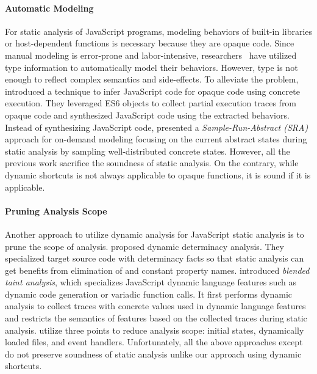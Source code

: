 \paragraph{Automatic Modeling}
For static analysis of JavaScript programs, modeling behaviors of built-in
libraries or host-dependent functions is necessary because they are opaque code.
Since manual modeling is error-prone and labor-intensive,
researchers~\cite{safewapi, safets} have utilized type information to
automatically model their behaviors.  However, type is not enough
to reflect complex semantics and side-effects.
To alleviate the problem, \citet{mimic} introduced a technique
to infer JavaScript code for opaque code using concrete execution.
They leveraged ES6  objects to collect partial execution traces
from opaque code and synthesized JavaScript code using the extracted behaviors.
Instead of synthesizing JavaScript code,
\citet{opaque-model} presented a \textit{Sample-Run-Abstract (SRA)} approach for
on-demand modeling focusing on the current abstract states during static analysis
by sampling well-distributed concrete states.
However, all the previous work sacrifice the soundness of static analysis.
On the contrary, while dynamic shortcuts is not always applicable to opaque
functions, it is sound if it is applicable.


\paragraph{Pruning Analysis Scope}
Another approach to utilize dynamic analysis for JavaScript static analysis is
to prune the scope of analysis.  \citet{determinacy} proposed dynamic
determinacy analysis.  They specialized target source code with determinacy
facts so that static analysis can get benefits from elimination of 
and constant property names.
\citet{blended} introduced \textit{blended taint analysis}, which specializes JavaScript dynamic
language features such as dynamic code generation or variadic function calls.
It first performs dynamic analysis to collect traces with concrete values used
in dynamic language features and restricts the semantics of features based on the
collected traces during static analysis.  \citet{battles, eha} utilize three points to reduce
analysis scope: initial states, dynamically loaded files, and event handlers.
Unfortunately, all the above approaches except~\cite{determinacy} do not preserve
soundness of static analysis unlike our approach using dynamic shortcuts.


% 

